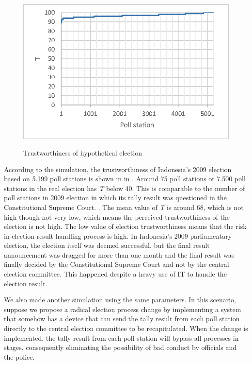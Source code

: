 \documentclass[JIP]{ipsj}
\begin{document}
\begin{figure}[tb]%
\vbox{\it
  \hbox{\includegraphics[scale=0.8]{images/Trustworthiness3.eps}}}
\centerline{}
\caption{Trustworthiness of hypothetical election}
\label{fig:result3}
\end{figure}

According to the simulation, the trustworthiness of Indonesia's 2009 election based on 5.199 poll stations is shown in in . Around 75 poll stations or 7.500 poll stations in the real election has \textit{T} below 40. This is comparable to the number of poll stations in 2009 election in which its tally result was questioned in the Constitutional Supreme Court. \cite{kemitraan201109}. The mean value of \textit{T} is around 68, which is not high though not very low, which means the perceived trustworthiness of the election is not high. The low value of election trustworthiness means that the risk in election result handling process is high. In Indonesia's 2009 parliamentary election, the election itself was deemed successful, but the final result announcement was dragged for more than one month and the final result was finally decided by the Constitutional Supreme Court and not by the central election committee. This happened despite a heavy use of IT to handle the election result.

We also made another simulation using the same parameters. In this scenario, suppose we propose a radical election process change by implementing a system that somehow has a device that can send the tally result from each poll station directly to the central election committee to be recapitulated. When the change is implemented, the tally result from each poll station will bypass all processes in stages, consequently eliminating the possibility of bad conduct by officials and the police.
\end{document}
